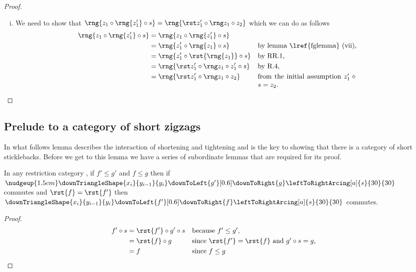 \begin{proof}
\begin{enumerate}[(i)]
\item %
We need to show that 
$\rng{z_1 \circ \rng{z'_1} \circ s} 
     =\rng{\rstTightener{z}{1} \circ z_2}$ 
which we can do as follows
\begin{align*}
\rng{z_1 \circ \rng{z'_1} \circ s} &= \rng{z_1 \circ \rng{z'_1} \circ s}\\
         &= \rng{z'_1 \circ \rng{z_1} \circ s}
            && \mbox{by lemma \lref{fglemma} (vii),}\\
         &= \rng{z'_1 \circ \rst{\rng{z_1}} \circ s}
            && \mbox{by RR.1,}\\
         &= \rng{
                    \rstTightener{z}{1}
                    \circ z'_1 \circ s
                 }
            &&\mbox{by R.4,}\\
         &= \rng{\rstTightener{z}{1} \circ z_2 }
            &&\parbox[t]{5cm}{from the initial assumption  $z'_1 \circ s = z_2$.} 
\end{align*}
\end{enumerate}
\end{proof}

\subsection{Prelude to a category of short zigzags}

In what follows lemma 
describes the interaction of shortening and tightening 
and is the key to showing that there is a category of short sticklebacks. Before we get to this lemma we have a series of
subordinate lemmas that are required for its proof. 
 
\begin{lemma}
In any restriction category \catcw, 
if $f' \leq g'$ and $f \leq g$ then if  
$\nudgeup{1.5cm} %
\downTriangleShape{x_i}{y_{i-1}}{y_i}
\downToLeft{g'}[0.6]
\downToRight{g}
\leftToRightArcing[a]{s}{30}{30} 
$ commutes 
and $\rst{f}=\rst{f'}$ then
$\downTriangleShape{x_i}{y_{i-1}}{y_i}
\downToLeft{f'}[0.6]
\downToRight{f}
\leftToRightArcing[a]{s}{30}{30} 
$ commutes.
\end{lemma}
\begin{proof}
\begin{align}
f' \circ s 
   &= \rst{f'} \circ g'\circ s 
       && \mbox{because $f' \leq g'$,}\\
   &= \rst{f} \circ g 
   && \mbox{since $\rst{f'}=\rst{f}$ 
              and $g' \circ s = g$, }\\
   &= f
   &&\mbox{since $f \leq g$}
\end{align}
\end{proof}


